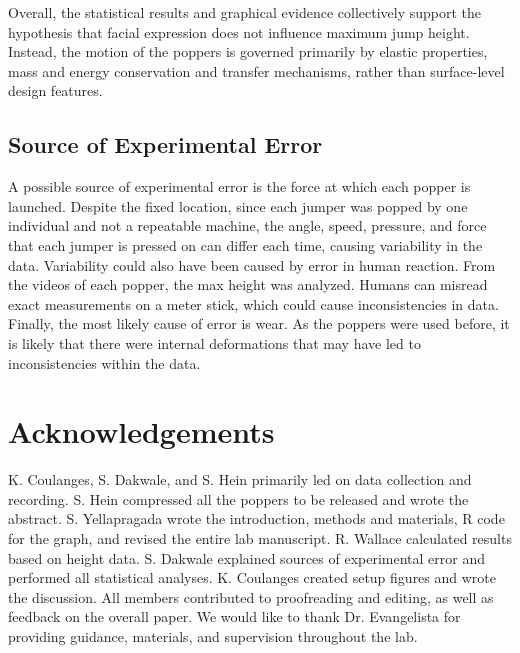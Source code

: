\documentclass[amsmath,amssymb,aps, endfloats, linenumbers]{revtex4-2}
\begin{document}
Overall, the statistical results and graphical evidence collectively support the hypothesis that facial expression does not influence maximum jump height. Instead, the motion of the poppers is governed primarily by elastic properties, mass and energy conservation and transfer mechanisms, rather than surface-level design features.

\subsection{Source of Experimental Error}
A possible source of experimental error is the force at which each popper is launched. Despite the fixed location, since each jumper was popped by one individual and not a repeatable machine, the angle, speed, pressure, and force that each jumper is pressed on can differ each time, causing variability in the data. Variability could also have been caused by error in human reaction. From the videos of each popper, the max height was analyzed. Humans can misread exact measurements on a meter stick, which could cause inconsistencies in data. Finally, the most likely cause of error is wear. As the poppers were used before, it is likely that there were internal deformations that may have led to inconsistencies within the data.

\section{Acknowledgements}
K. Coulanges, S. Dakwale, and S. Hein primarily led on data collection and recording. S. Hein compressed all the poppers to be released and wrote the abstract. S. Yellapragada wrote the introduction, methods and materials, R code for the graph, and revised the entire lab manuscript. R. Wallace calculated results based on height data. S. Dakwale explained sources of experimental error and performed all statistical analyses. K. Coulanges created setup figures and wrote the discussion. All members contributed to proofreading and editing, as well as feedback on the overall paper. We would like to thank Dr. Evangelista for providing guidance, materials, and supervision throughout the lab.


\end{document}
